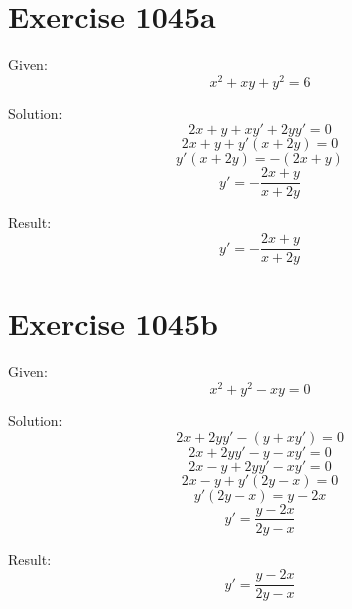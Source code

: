 \documentclass[a4paper, 10pt]{scrartcl}
\begin{document}
\section{Exercise 1045a}

Given:
\[
x^{2} + xy + y^{2} = 6
\]

Solution:
\[
2x + y + xy' + 2yy' = 0
\]
\[
2x + y + y'(x + 2y) = 0
\]
\[
y'(x + 2y) = -(2x + y)
\]
\[
y' = -\frac{2x + y}{x + 2y}
\]

Result:
\[
y' = -\frac{2x + y}{x + 2y}
\]

\section{Exercise 1045b}

Given:
\[
x^{2} + y^{2} - xy = 0
\]

Solution:
\[
2x + 2yy' - (y + xy') = 0
\]
\[
2x + 2yy' - y - xy' = 0
\]
\[
2x - y + 2yy' - xy' = 0
\]
\[
2x - y + y'(2y - x) = 0
\]
\[
y'(2y - x) = y - 2x
\]
\[
y' = \frac{y - 2x}{2y - x}
\]

Result:
\[
y' = \frac{y - 2x}{2y - x}
\]
\end{document}
